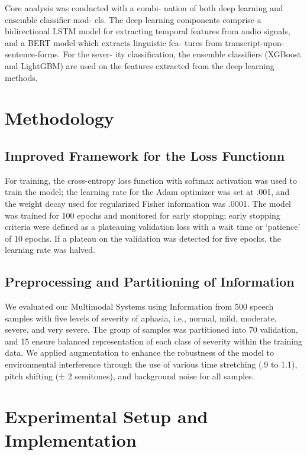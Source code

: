 \documentclass[conference]{IEEEtran}
\begin{document}
Core analysis was conducted with a combi-
nation of both deep learning and ensemble classifier mod-
els. The deep learning components comprise a bidirectional
LSTM model for extracting temporal features from audio
signals, and a BERT model which extracts linguistic fea-
tures from transcript-upon-sentence-forms. For the sever-
ity classification, the ensemble classifiers (XGBoost and
LightGBM) are used on the features extracted from the
deep learning methods.

\section{Methodology}

\subsection{Improved Framework for the Loss Functionn}

For training, the cross-entropy loss function with softmax
activation was used to train the model; the learning rate for the
Adam optimizer was set at .001, and the weight decay used
for regularized Fisher information was .0001. The model was
trained for 100 epochs and monitored for early stopping;
early stopping criteria were defined as a plateauing validation
loss with a wait time or ‘patience’ of 10 epochs. If a plateau
on the validation was detected for five epochs, the learning
rate was halved.

\subsection{Preprocessing and Partitioning of Information}

We evaluated our Multimodal Systems using Information from
500 speech samples with five levels of severity of aphasia, i.e.,
normal, mild, moderate, severe, and very severe. The group of
samples was partitioned into 70%
validation, and 15%
ensure balanced representation of each class of severity within
the training data. We applied augmentation to enhance the
robustness of the model to environmental interference
through the use of various time stretching (.9 to 1.1), pitch
shifting (± 2 semitones), and background noise for all samples.

\section{Experimental Setup and Implementation}
\end{document}

